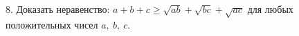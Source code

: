 8. Доказать неравенство: $a+b+c\geqslant\sqrt{ab}+\sqrt{bc}+\sqrt{ac}$ для любых положительных чисел $a,\ b,\ c.$\\
